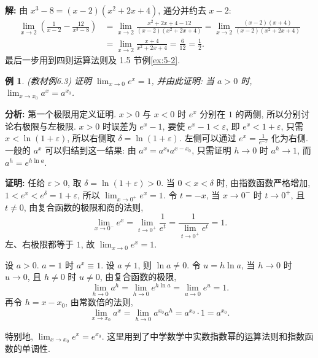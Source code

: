 \documentclass[UTF8,openany]{ctexbook}
\theoremstyle{chinesetextbook}
\newtheorem{example}{例}[section]
\newenvironment{cnproof}{\par\indent\textbf{证明:} \ignorespaces}{\par}
\newenvironment{cnsolution}{\par\indent\textbf{解:} \ignorespaces}{\par}
\begin{document}
\begin{cnsolution}
由 $x^3-8=(x-2)(x^2+2x+4)$, 通分并约去 $x-2$:
\[
\begin{aligned}
\lim_{x\to2}\left(\frac1{x-2}-\frac{12}{x^3-8}\right)
&=\lim_{x\to2}\frac{x^2+2x+4-12}{(x-2)(x^2+2x+4)}=\lim_{x\to2}\frac{(x-2)(x+4)}{(x-2)(x^2+2x+4)}\\
&=\lim_{x\to2}\frac{x+4}{x^2+2x+4}=\frac6{12}=\frac12.
\end{aligned}
\]
最后一步用到四则运算法则及 1.5 节例\ref{ex:5-2}.
\end{cnsolution}
\begin{example}\label{ex:6-3}
\textnormal{(教材例6.3)} 证明 $\displaystyle\lim_{x\to0}e^x=1$, 并由此证明: 当 $a>0$ 时, $\displaystyle\lim_{x\to x_0}a^x=a^{x_0}$.
\end{example}
\par\indent\textbf{分析:} 第一个极限用定义证明. $x>0$ 与 $x<0$ 时 $e^x$ 分别在 $1$ 的两侧, 所以分别讨论右极限与左极限. $x>0$ 时误差为 $e^x-1$, 要使 $e^x-1<\varepsilon$, 即 $e^x<1+\varepsilon$, 只需 $x<\ln(1+\varepsilon)$, 所以右侧取 $\delta=\ln(1+\varepsilon)$. 左侧可以通过 $\displaystyle e^x=\frac1{e^{-x}}$ 化为右侧. 一般的 $a^x$ 可以归结到这一结果: 由 $a^x=a^{x_0}a^{x-x_0}$, 只需证明 $h\to0$ 时 $a^h\to1$, 而 $a^h=e^{h\ln a}$.
\begin{cnproof}
任给 $\varepsilon>0$, 取 $\delta=\ln(1+\varepsilon)>0$. 当 $0<x<\delta$ 时, 由指数函数严格增加, $1<e^x<e^\delta=1+\varepsilon$, 所以 $\displaystyle\lim_{x\to0^+}e^x=1$. 令 $t=-x$, 当 $x\to0^-$ 时 $t\to0^+$, 且 $t\ne0$, 由复合函数的极限和商的法则,
\[
\lim_{x\to0^-}e^x=\lim_{t\to0^+}\frac1{e^t}=\frac1{\displaystyle\lim_{t\to0^+}e^t}=1.
\]
左、右极限都等于 $1$, 故 $\displaystyle\lim_{x\to0}e^x=1$.

设 $a>0$. $a=1$ 时 $a^x\equiv1$. 设 $a\ne1$, 则 $\ln a\ne0$. 令 $u=h\ln a$, 当 $h\to0$ 时 $u\to0$, 且 $h\ne0$ 时 $u\ne0$, 由复合函数的极限,
\[
\lim_{h\to0}a^h=\lim_{h\to0}e^{h\ln a}=\lim_{u\to0}e^u=1.
\]
再令 $h=x-x_0$, 由常数倍的法则,
\[
\lim_{x\to x_0}a^x=\lim_{h\to0}a^{x_0}a^h=a^{x_0}\cdot1=a^{x_0}.
\]
\end{cnproof}
特别地, $\displaystyle\lim_{x\to x_0}e^x=e^{x_0}$. 这里用到了中学数学中实数指数幂的运算法则和指数函数的单调性.
\end{document}
